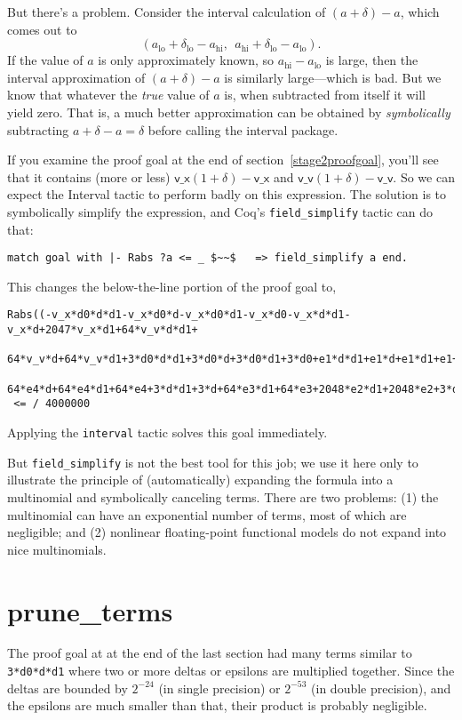 \documentclass[article]{memoir}
\begin{document}
But there's a problem.  Consider the interval calculation of
$(a+\delta)-a$, which comes out to
\[(a_\mathrm{lo}+\delta_\mathrm{lo}-a_\mathrm{hi},~~a_\mathrm{hi}+\delta_\mathrm{lo}-a_\mathrm{lo}).\]
If the value of $a$ is only approximately known, so
$a_\mathrm{hi}-a_\mathrm{lo}$ is large, then the interval approximation
of $(a+\delta)-a$ is similarly large---which is bad.  But we know that whatever the \emph{true} value of $a$ is, when subtracted from itself it will yield zero.
That is, a much better approximation can be obtained by
\emph{symbolically} subtracting $a+\delta-a=\delta$
before calling the interval package.

If you examine the proof goal at the end of section~\ref{stage2proofgoal},
you'll see that it contains (more or less)
$\mathsf{v\_x}(1+\delta)-\mathsf{v\_x}$ and
$\mathsf{v\_v}(1+\delta)-\mathsf{v\_v}$.  So we can expect the Interval
tactic to perform badly on this expression.
The solution is to symbolically simplify the expression,
and Coq's \lstinline{field_simplify} tactic can do that:

\begin{lstlisting}
match goal with |- Rabs ?a <= _ $~~$   => field_simplify a end.
\end{lstlisting}
This changes the below-the-line portion of the proof goal to,
\begin{lstlisting}
Rabs((-v_x*d0*d*d1-v_x*d0*d-v_x*d0*d1-v_x*d0-v_x*d*d1-v_x*d+2047*v_x*d1+64*v_v*d*d1+
   64*v_v*d+64*v_v*d1+3*d0*d*d1+3*d0*d+3*d0*d1+3*d0+e1*d*d1+e1*d+e1*d1+e1+64*e4*d*d1+
   64*e4*d+64*e4*d1+64*e4+3*d*d1+3*d+64*e3*d1+64*e3+2048*e2*d1+2048*e2+3*d1+2048*e0)/2048)
 <= / 4000000
\end{lstlisting}
Applying the \lstinline{interval} tactic solves this goal immediately.

But \lstinline{field_simplify} is not the best tool for this job;
we use it here only to illustrate the principle of (automatically) expanding the
formula into a multinomial and symbolically canceling terms.
There are two problems: (1) the multinomial can have an exponential number of terms, most of which are negligible; and (2) nonlinear floating-point functional models do not expand into nice multinomials.

\chapter{prune\_terms}

The proof goal at at the end of the last section had many terms
similar to \lstinline{3*d0*d*d1} where two or more deltas or epsilons
are multiplied together.  Since the deltas are bounded by $2^{-24}$
(in single precision) or $2^{-53}$ (in double precision),
and the epsilons are much smaller than that, their product is
probably negligible.
\end{document}
